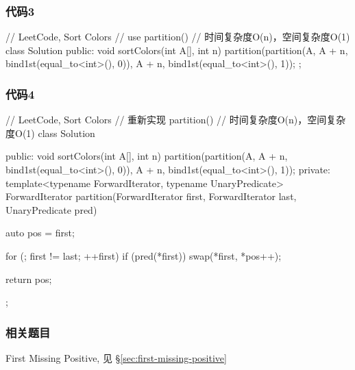 \subsubsection{代码3}
\begin{Code}
// LeetCode, Sort Colors
// use partition()
// 时间复杂度O(n)，空间复杂度O(1)
class Solution {
public:
    void sortColors(int A[], int n) {
        partition(partition(A, A + n, bind1st(equal_to<int>(), 0)), A + n,
                bind1st(equal_to<int>(), 1));
    }
};
\end{Code}


\subsubsection{代码4}
\begin{Code}
// LeetCode, Sort Colors
// 重新实现 partition()
// 时间复杂度O(n)，空间复杂度O(1)
class Solution {
public:
    void sortColors(int A[], int n) {
        partition(partition(A, A + n, bind1st(equal_to<int>(), 0)), A + n,
                bind1st(equal_to<int>(), 1));
    }
private:
    template<typename ForwardIterator, typename UnaryPredicate>
    ForwardIterator partition(ForwardIterator first, ForwardIterator last,
            UnaryPredicate pred) {
        auto pos = first;

        for (; first != last; ++first)
            if (pred(*first))
                swap(*first, *pos++);

        return pos;
    }
};
\end{Code}


\subsubsection{相关题目}
\begindot
\item First Missing Positive, 见 \S \ref{sec:first-missing-positive}
\myenddot
